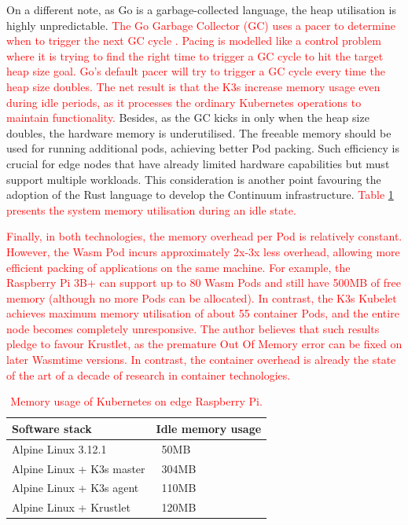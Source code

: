 On a different note, as Go is a garbage-collected language, the heap utilisation is highly unpredictable. \textcolor{red}{The Go Garbage Collector (GC) uses a pacer to determine when to trigger the next GC cycle \cite{go-gc}. Pacing is modelled like a control problem where it is trying to find the right time to trigger a GC cycle to hit the target heap size goal. Go’s default pacer will try to trigger a GC cycle every time the heap size doubles. The net result is that the K3s increase memory usage even during idle periods, as it processes the ordinary Kubernetes operations to maintain functionality.} Besides, as the GC kicks in only when the heap size doubles, the hardware memory is underutilised. The freeable memory should be used for running additional pods, achieving better Pod packing. Such efficiency is crucial for edge nodes that have already limited hardware capabilities but must support multiple workloads. This consideration is another point favouring the adoption of the Rust language to develop the Continuum infrastructure. \textcolor{red}{Table \ref{tab1} presents the system memory utilisation during an idle state.}

\textcolor{red}{Finally, in both technologies, the memory overhead per Pod is relatively constant. However, the Wasm Pod incurs approximately 2x-3x less overhead, allowing more efficient packing of applications on the same machine. For example, the Raspberry Pi 3B+ can support up to 80 Wasm Pods and still have 500MB of free memory (although no more Pods can be allocated). In contrast, the K3s Kubelet achieves maximum memory utilisation of about 55 container Pods, and the entire node becomes completely unresponsive. The author believes that such results pledge to favour Krustlet, as the premature Out Of Memory error can be fixed on later Wasmtime versions. In contrast, the container overhead is already the state of the art of a decade of research in container technologies.}

\begin{table}
\caption{\textcolor{red}{Memory usage of Kubernetes on edge Raspberry Pi.}}
\begin{tabular}{|l|l|}
\hline
Software stack & Idle memory usage \\
\hline
Alpine Linux 3.12.1 & ~50MB \\
Alpine Linux + K3s master & ~304MB \\
Alpine Linux + K3s agent & ~110MB \\
Alpine Linux + Krustlet & ~120MB \\
\hline
\end{tabular}
\label{tab1}
\end{table}

